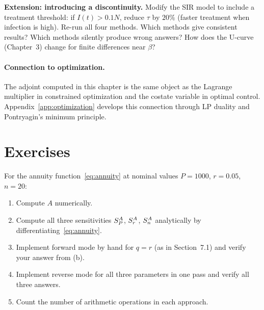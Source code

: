 \textbf{Extension: introducing a discontinuity.}
Modify the SIR model to include a treatment threshold: if $I(t) > 0.1N$,
reduce $\tau$ by $20\%$ (faster treatment when infection is high).
Re-run all four methods. Which methods give consistent results?
Which methods silently produce wrong answers? How does the U-curve
(Chapter~3) change for finite differences near $\beta$?

\paragraph{Connection to optimization.} The adjoint computed in this
chapter is the same object as the Lagrange multiplier in constrained
optimization and the costate variable in optimal control.
Appendix~\ref{app:optimization} develops this connection through
LP duality and Pontryagin's minimum principle.

\section{Exercises}

\begin{exercise}[\bloom{L3}]
\label{ex:ch7:annuity}
For the annuity function~\eqref{eq:annuity} at nominal values
$P = 1000$, $r = 0.05$, $n = 20$:
\begin{enumerate}[label=(\alph*)]
  \item Compute $A$ numerically.
  \item Compute all three sensitivities $S_{P}^{A}$, $S_{r}^{A}$, $S_{n}^{A}$
        analytically by differentiating~\eqref{eq:annuity}.
  \item Implement forward mode by hand for $q = r$ (as in Section~7.1)
        and verify your answer from (b).
  \item Implement reverse mode for all three parameters in one pass
        and verify all three answers.
  \item Count the number of arithmetic operations in each approach.
\end{enumerate}
\end{exercise}

